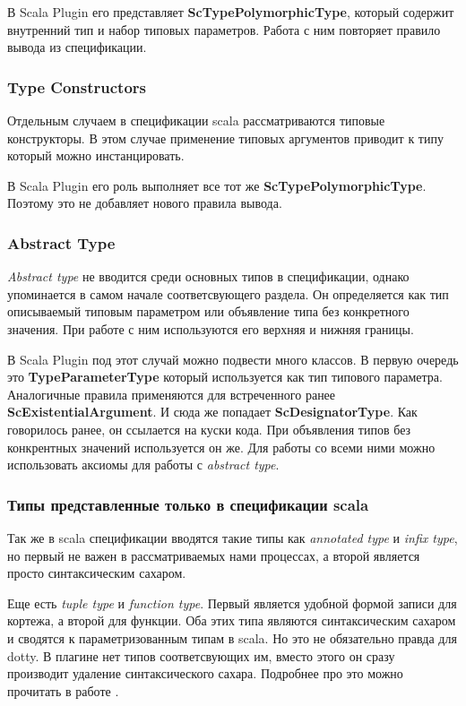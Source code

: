 В Scala Plugin его представляет \textbf{ScTypePolymorphicType}, который содержит
внутренний тип и набор типовых параметров.
Работа с ним повторяет правило вывода из спецификации.

\subsubsection{Type Constructors}
Отдельным случаем в спецификации scala рассматриваются типовые конструкторы.
В этом случае применение типовых аргументов приводит к типу который можно
инстанцировать.

В Scala Plugin его роль выполняет все тот же \textbf{ScTypePolymorphicType}.
Поэтому это не добавляет нового правила вывода.

\subsubsection{Abstract Type}

\textit{Abstract type} не вводится среди основных типов в спецификации, однако
упоминается в самом начале соответсвующего раздела.
Он определяется как тип описываемый типовым параметром или объявление типа без
конкретного значения.
При работе с ним используются его верхняя и нижняя границы.

В Scala Plugin под этот случай можно подвести много классов.
В первую очередь это \textbf{TypeParameterType} который используется как тип
типового параметра.
Аналогичные правила применяются для встреченного ранее
\textbf{ScExistentialArgument}.
И сюда же попадает \textbf{ScDesignatorType}.
Как говорилось ранее, он ссылается на куски кода.
При объявления типов без конкрентных значений используется он же.
Для работы со всеми ними можно использовать аксиомы для работы с \textit{abstract type}.

\subsubsection{Типы представленные только в спецификации scala}
Так же в scala спецификации вводятся такие типы как \textit{annotated type} и
\textit{infix type}, но первый не важен в рассматриваемых нами процессах,
а второй является просто синтаксическим сахаром.

Еще есть \textit{tuple type} и \textit{function type}.
Первый является удобной формой записи для кортежа, а второй для функции.
Оба этих типа являются синтаксическим сахаром и сводятся к параметризованным
типам в scala.
Но это не обязательно правда для dotty.
В плагине нет типов соответсвующих им, вместо этого он сразу производит
удаление синтаксического сахара.
Подробнее про это можно прочитать в работе \cite{kozlov}.

